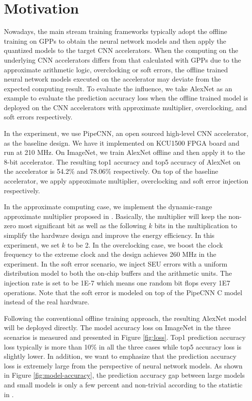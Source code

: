 \section{Motivation} \label{sec:motivation}
Nowadays, the main stream training frameworks typically adopt the offline training
on GPPs to obtain the neural network models and then apply the quantized models to the 
target CNN accelerators. When the computing on the underlying CNN accelerators differs
from that calculated with GPPs due to the approximate arithmetic logic, overclocking or 
soft errors, the offline trained neural network models executed on the accelerator 
may deviate from the expected computing result. To evaluate the influence, 
we take AlexNet as an example to evaluate the prediction 
accuracy loss when the offline trained model is deployed on the CNN 
accelerators with approximate multiplier, overclocking, and soft errors respectively. 

In the experiment, we use PipeCNN\cite{pipecnn_2}, an open sourced high-level CNN accelerator, 
as the baseline design. We have it implemented on KCU1500 FPGA board and run at 210 MHz. 
On ImageNet, we train AlexNet offline and then apply it to the 8-bit accelerator. 
The resulting top1 accuracy and top5 accuracy of AlexNet on the accelerator 
is 54.2\% and 78.06\% respectively. On top of the baseline accelerator, we apply 
approximate multiplier, overclocking and soft error injection respectively. 

In the approximate computing case, we implement the dynamic-range approximate 
multiplier proposed in \cite{Approximate_Multiplier_31}. Basically, the multiplier 
will keep the non-zero most significant bit as well as the following $k$ bits in the 
multiplication to simplify the hardware design and improve the energy efficiency.
In this experiment, we set $k$ to be 2. In the overclocking case, we boost the clock frequency 
to the extreme clock and the design achieves 260 MHz in the experiment. 
In the soft error scenario, we inject SEU errors with a uniform distribution model to 
both the on-chip buffers and the arithmetic units. The injection rate is set to be 
1E-7 which means one random bit flops every 1E7 operations. Note that the soft error is modeled 
on top of the PipeCNN C model instead of the real hardware.

Following the conventional offline training approach, the resulting AlexNet model 
will be deployed directly. The model accuracy loss on ImageNet in the three scenarios is 
measured and presented in Figure \ref{fig:loss}. Top1 prediction accuracy loss 
typically is more than 10\% in all the three cases while top5 accuracy loss is slightly 
lower. In addition, we want to emphasize that the prediction accuracy loss is extremely large 
from the perspective of neural network models. 
As shown in Figure \ref{fig:model-accuracy}, the prediction accuracy gap between 
large models and small models is only a few percent and non-trivial according to the 
statistic in \cite{model-accuracy}.  

